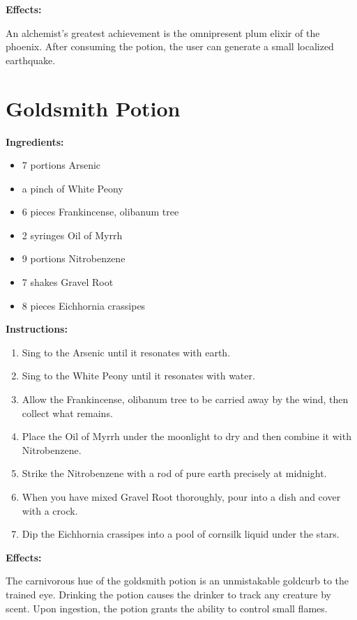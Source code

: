 \documentclass{article}
\begin{document}
\textbf{Effects:}

An alchemist's greatest achievement is the omnipresent plum elixir of the phoenix. After consuming the potion, the user can generate a small localized earthquake.

\newpage
\section*{Goldsmith Potion}

\textbf{Ingredients:}

\begin{itemize}
  \item 7 portions Arsenic
  \item a pinch of White Peony
  \item 6 pieces Frankincense, olibanum tree
  \item 2 syringes Oil of Myrrh
  \item 9 portions Nitrobenzene
  \item 7 shakes Gravel Root
  \item 8 pieces Eichhornia crassipes
\end{itemize}

\textbf{Instructions:}

\begin{enumerate}
  \item Sing to the Arsenic until it resonates with earth.
  \item Sing to the White Peony until it resonates with water.
  \item Allow the Frankincense, olibanum tree to be carried away by the wind, then collect what remains.
  \item Place the Oil of Myrrh under the moonlight to dry and then combine it with Nitrobenzene.
  \item Strike the Nitrobenzene with a rod of pure earth precisely at midnight.
  \item When you have mixed Gravel Root thoroughly, pour into a dish and cover with a crock.
  \item Dip the Eichhornia crassipes into a pool of cornsilk liquid under the stars.
\end{enumerate}

\textbf{Effects:}

The carnivorous hue of the goldsmith potion is an unmistakable goldcurb to the trained eye. Drinking the potion causes the drinker to track any creature by scent. Upon ingestion, the potion grants the ability to control small flames.
\end{document}
